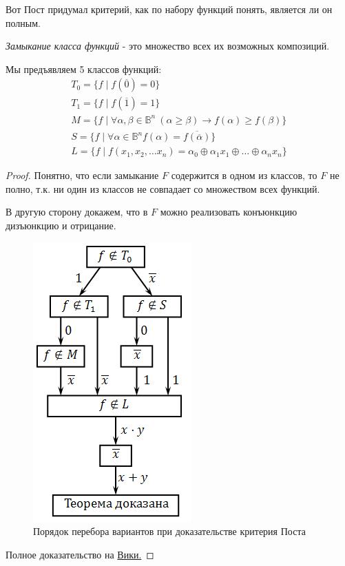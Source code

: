 Вот Пост придумал критерий, как по набору функций понять, является ли он полным.

\textit{Замыкание класса функций} - это множество всех их возможных композиций.

Мы предъявляем 5 классов функций:
\begin{align*}
	T_0 = \{f \mid f(\overline{0}) = 0\}\\
	T_1 = \{f \mid f(\overline{1}) = 1\}\\
	M = \{f \mid \forall \alpha, \beta \in \mathbb{B}^n\ (\alpha \geq \beta) \rightarrow f(\alpha) \geq f(\beta)\}\\
	S = \{f \mid \forall \alpha \in \mathbb{B}^n f(\alpha) = \overline{f(\overline{\alpha})}\}\\
	L = \{f \mid f(x_1, x_2, \ldots x_n) = \alpha_0 \oplus \alpha_1x_1 \oplus \ldots \oplus \alpha_nx_n\}
\end{align*}


\begin{proof}
	Понятно, что если замыкание $F$ содержится в одном из классов, то $F$ не полно, т.к. ни один из классов не совпадает со множеством всех функций.
	
	В другую сторону докажем, что в $F$ можно реализовать конъюнкцию дизъюнкцию и отрицание. 
	
	\begin{figure}[H]
		\centering
		\includegraphics[scale=0.4]{images/post_sheme.png}
		\caption{Порядок перебора вариантов при доказательстве критерия Поста}
	\end{figure}
	
	Полное доказательство на \href{https://ru.wikipedia.org/wiki/%D0%9A%D1%80%D0%B8%D1%82%D0%B5%D1%80%D0%B8%D0%B9_%D0%9F%D0%BE%D1%81%D1%82%D0%B0}{Вики.}
\end{proof}
